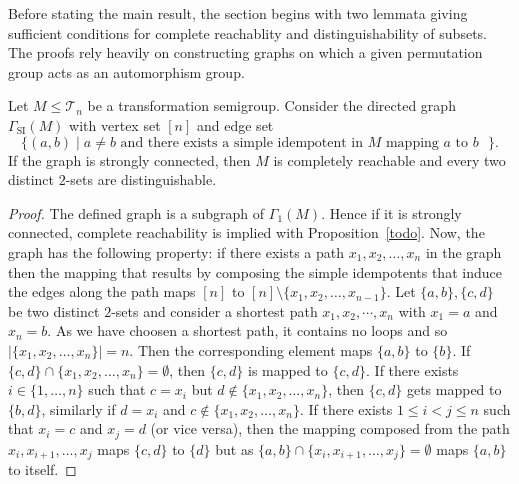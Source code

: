 \begin{toappendix}
Before stating the main result, the section begins with two lemmata giving sufficient
conditions for complete reachablity and distinguishability of subsets. The proofs
rely heavily on constructing graphs on which a given permutation group acts as
an automorphism group.











\begin{lemma}
\label{sync_max:lem:sufficient_compl_reach}
Let $M \le \mathcal T_n$ be a transformation semigroup. 
Consider the directed graph $\Gamma_{\text{SI}}(M)$ with vertex set $[n]$ 
and edge set
\[ 
\{ (a,b) \mid a \ne b \text{ and there exists a simple idempotent in $M$ mapping $a$ to $b$ } \}.
\]
If the graph is strongly connected, then $M$
is completely reachable
and every two distinct $2$-sets are distinguishable.
\end{lemma}
\begin{proof}
The defined graph is a subgraph of $\Gamma_1(M)$.
Hence if it is strongly connected, complete reachability
is implied with Proposition~\ref{todo}. 
Now, the graph has the following property:
if there exists a path $x_1, x_2, \ldots, x_n$
in the graph then the mapping that results by composing the simple idempotents
that induce the edges along the path maps $[n]$ to $[n] \setminus \{x_1, x_2, \ldots, x_{n-1}\}$.
Let $\{a,b\}, \{c,d\}$ be two distinct $2$-sets
and consider a shortest path $x_1, x_2, \cdots, x_n$
with $x_1 = a$ and $x_n = b$.
As we have choosen a shortest path, it contains no loops
and so $|\{x_1, x_2, \ldots, x_n\}| = n$.
Then the corresponding element maps $\{a,b\}$ to $\{b\}$.
If $\{c,d\} \cap \{x_1, x_2, \ldots, x_n\} = \emptyset$,
then $\{c,d\}$ is mapped to $\{c,d\}$.
If there exists $i \in \{1,\ldots,n\}$
such that $c = x_i$ but $d \notin \{x_1, x_2, \ldots, x_n\}$,
then $\{c,d\}$ gets mapped to $\{b,d\}$, similarly
if $d = x_i$ and $c \notin \{x_1, x_2, \ldots, x_n\}$.
If there exists $1 \le i < j \le n$
such that $x_i = c$ and $x_j = d$ (or vice versa), 
then the mapping composed from
the path $x_i, x_{i+1}, \ldots, x_j$ maps $\{c,d\}$ to $\{d\}$
but as $\{a,b\}\cap \{x_i,x_{i+1},\ldots,x_j\} = \emptyset$
maps $\{a,b\}$ to itself.
\end{proof}
\end{toappendix}

